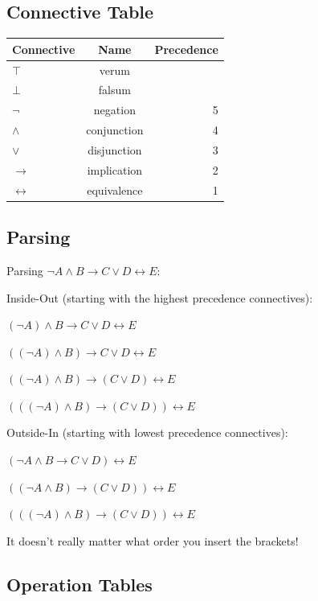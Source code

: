 \documentclass[11pt,a4paper]{article}
\begin{document}
\subsection{Connective Table}

\begin{tabular}{l | c | r}
Connective & Name & Precedence \\
\hline
$\top$ & verum \\
$\bot$ & falsum \\
$\neg$ & negation & 5 \\
$\wedge$ & conjunction & 4 \\
$\vee$ & disjunction & 3 \\
$\rightarrow$ & implication & 2 \\
$\leftrightarrow$ & equivalence & 1 \\
\end{tabular}

\subsection{Parsing}

Parsing $\neg A \wedge B \rightarrow C \vee D \leftrightarrow E$:

\vspace{5pt}
Inside-Out (starting with the highest precedence connectives):

$(\neg A) \wedge B \rightarrow C \vee D \leftrightarrow E$

$((\neg A) \wedge B) \rightarrow C \vee D \leftrightarrow E$

$((\neg A) \wedge B) \rightarrow (C \vee D) \leftrightarrow E$

$(((\neg A) \wedge B) \rightarrow (C \vee D)) \leftrightarrow E$

\vspace{5pt}
Outside-In (starting with lowest precedence connectives):

$(\neg A \wedge B \rightarrow C \vee D) \leftrightarrow E$

$((\neg A \wedge B) \rightarrow (C \vee D)) \leftrightarrow E$

$(((\neg A) \wedge B) \rightarrow (C \vee D)) \leftrightarrow E$

\vspace{5pt}
It doesn't really matter what order you insert the brackets!

\subsection{Operation Tables}
\end{document}
